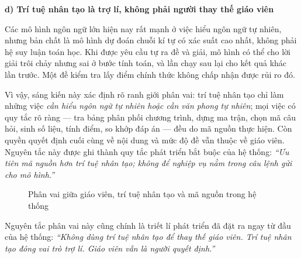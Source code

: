 \textbf{d) Trí tuệ nhân tạo là trợ lí, không phải người thay thế giáo viên}

Các mô hình ngôn ngữ lớn hiện nay rất mạnh ở việc hiểu ngôn ngữ tự nhiên,
nhưng bản chất là mô hình dự đoán chuỗi kí tự có xác suất cao nhất, không phải
hệ suy luận toán học. Khi được yêu cầu tự ra đề và giải, mô hình có thể cho
lời giải trôi chảy nhưng sai ở bước tính toán, và lần chạy sau lại cho kết quả
khác lần trước. Một đề kiểm tra lấy điểm chính thức không chấp nhận được rủi
ro đó.

Vì vậy, sáng kiến này xác định rõ ranh giới phân vai: trí tuệ nhân tạo chỉ làm
những việc \textit{cần hiểu ngôn ngữ tự nhiên hoặc cần văn phong tự nhiên};
mọi việc có quy tắc rõ ràng --- tra bảng phân phối chương trình, dựng ma trận,
chọn mã câu hỏi, sinh số liệu, tính điểm, so khớp đáp án --- đều do mã nguồn
thực hiện. Còn quyền quyết định cuối cùng về nội dung và mức độ đề vẫn thuộc
về giáo viên. Nguyên tắc này được ghi thành quy tắc phát triển bắt buộc của hệ
thống: \textit{``Ưu tiên mã nguồn hơn trí tuệ nhân tạo; không để nghiệp vụ nằm
trong câu lệnh gửi cho mô hình.''}

\begin{figure}[H]
\centering
{}
\caption{Phân vai giữa giáo viên, trí tuệ nhân tạo và mã nguồn trong hệ thống}
\end{figure}

Nguyên tắc phân vai này cũng chính là triết lí phát triển đã đặt ra ngay từ đầu
của hệ thống: \textit{``Không dùng trí tuệ nhân tạo để thay thế giáo viên. Trí
tuệ nhân tạo đóng vai trò trợ lí. Giáo viên vẫn là người quyết định.''}

\bigskip
